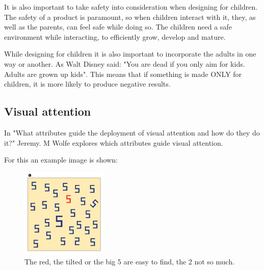 It is also important to take safety into consideration when designing for children. The safety of a product is paramount, so when children interact with it, they, as well as the parents, can feel safe while doing so. The children need a safe environment while interacting, to efficiently grow, develop and mature\cite{safetyKids}.

While designing for children it is also important to incorporate the adults in one way or another. As Walt Disney said: "You are dead if you only aim for kids. Adults are grown up kids"\cite{safetyKids}. This means that if something is made ONLY for children, it is more likely to produce negative results.










\subsection{Visual attention}\label{sec:visualAttention}

In "What attributes guide the deployment of visual attention and how do they do it?" Jeremy. M Wolfe explores which attributes guide visual attention\cite{Wolfe2004}.

For this an example image is shown:
\begin{figure}[H]
    	\centering
    	\includegraphics[width=0.4\linewidth]{figure/Analysis/natureFig1.png}
    	\caption{The red, the tilted or the big 5 are easy to find, the 2 not so much\cite{Wolfe2004}.}
    	\label{fig:hard2find}
    \end{figure}

